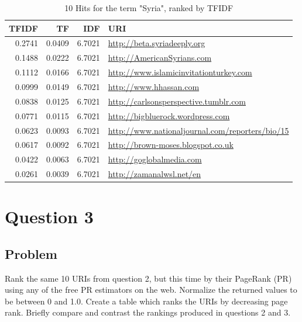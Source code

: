 \documentclass[letterpaper,11pt]{report}
\begin{document}
\begin{savenotes}
\begin{table}
	\centering
    \begin{tabular}{|r|r|r||l|}
    \hline
    TFIDF & TF     & IDF & URI                            \\ \hline
		0.2741 & 0.0409 & 6.7021 & \url{http://beta.syriadeeply.org}           \\ \hline
	  0.1488 & 0.0222 & 6.7021 & \url{http://AmericanSyrians.com}            \\ \hline
    0.1112 & 0.0166 & 6.7021 & \url{http://www.islamicinvitationturkey.com} \\ \hline				
    0.0999 & 0.0149 & 6.7021 & \url{http://www.hhassan.com}                \\ \hline
    0.0838 & 0.0125 & 6.7021 & \url{http://carlsonsperspective.tumblr.com} \\ \hline
    0.0771 & 0.0115 & 6.7021 & \url{http://bigbluerock.wordpress.com}      \\ \hline						
    0.0623 & 0.0093 & 6.7021 & \url{http://www.nationaljournal.com/reporters/bio/15}        \\ \hline
    0.0617 & 0.0092 & 6.7021 & \url{http://brown-moses.blogspot.co.uk}     \\ \hline		
    0.0422 & 0.0063 & 6.7021 & \url{http://goglobalmedia.com}              \\ \hline
    0.0261 & 0.0039 & 6.7021 & \url{http://zamanalwsl.net/en}                 \\ \hline
    \end{tabular}
    \caption {10 Hits for the term "Syria", ranked by TFIDF}
			\label{tab:TFIDF-Rank}
\end{table}


\section{Question 3}
\subsection{Problem}Rank the same 10 URIs from question 2, but this time by their PageRank (PR) using any of the free PR estimators on the web. Normalize the returned values to be between 0 and 1.0. Create a table which ranks the URIs by decreasing page rank. Briefly compare and contrast the rankings produced in questions 2 and 3.


\end{savenotes}
\end{document}
